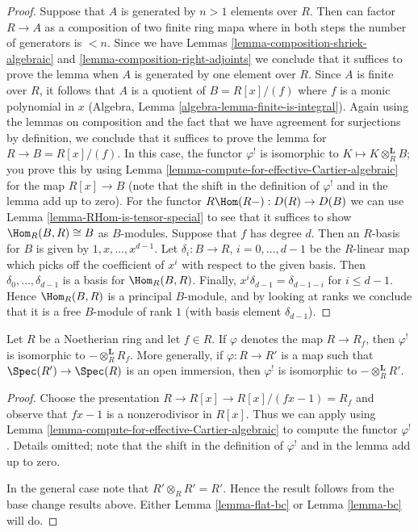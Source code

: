 \begin{proof}
Suppose that $A$ is generated by $n > 1$ elements over $R$.
Then can factor $R \to A$ as a composition of two finite ring mapa
where in both steps the number of generators is $< n$.
Since we have Lemmas \ref{lemma-composition-shriek-algebraic} and
\ref{lemma-composition-right-adjoints} we conclude that it suffices
to prove the lemma when $A$ is generated by one element over $R$.
Since $A$ is finite over $R$, it follows that $A$ is a quotient
of $B = R[x]/(f)$ where $f$ is a monic polynomial in $x$
(Algebra, Lemma \ref{algebra-lemma-finite-is-integral}).
Again using the lemmas on composition and the fact that we
have agreement for surjections by definition, we conclude that
it suffices to prove the lemma for $R \to B = R[x]/(f)$.
In this case, the functor $\varphi^!$ is isomorphic to
$K \mapsto K \otimes_R^\mathbf{L} B$; you prove this by
using Lemma \ref{lemma-compute-for-effective-Cartier-algebraic}
for the map $R[x] \to B$ (note that the shift in the definition
of $\varphi^!$ and in the lemma add up to zero).
For the functor $R\Hom(R -) : D(R) \to D(B)$ we can use
Lemma \ref{lemma-RHom-is-tensor-special}
to see that it suffices to show $\Hom_R(B, R) \cong B$
as $B$-modules. Suppose that $f$ has degree $d$.
Then an $R$-basis for $B$ is given by $1, x, \ldots, x^{d - 1}$.
Let $\delta_i : B \to R$, $i = 0, \ldots, d - 1$
be the $R$-linear map which picks off the coefficient
of $x^i$ with respect to the given basis. Then
$\delta_0, \ldots, \delta_{d - 1}$ is a basis for $\Hom_R(B, R)$.
Finally, $x^i \delta_{d - 1} = \delta_{d - 1 - i}$ for $i \leq d - 1$.
Hence $\Hom_R(B, R)$ is a principal $B$-module, and by looking
at ranks we conclude that it is a free $B$-module of rank $1$
(with basis element $\delta_{d - 1}$).
\end{proof}

\begin{lemma}
\label{lemma-upper-shriek-localize}
Let $R$ be a Noetherian ring and let $f \in R$.
If $\varphi$ denotes the map $R \to R_f$, then $\varphi^!$
is isomorphic to $- \otimes_R^\mathbf{L} R_f$.
More generally, if $\varphi : R \to R'$ is a map such that
$\Spec(R') \to \Spec(R)$ is an open immersion, then
$\varphi^!$ is isomorphic to $- \otimes_R^\mathbf{L} R'$.
\end{lemma}

\begin{proof}
Choose the presentation $R \to R[x] \to R[x]/(fx - 1) = R_f$ and observe
that $fx - 1$ is a nonzerodivisor in $R[x]$. Thus we can apply
using Lemma \ref{lemma-compute-for-effective-Cartier-algebraic}
to compute the functor $\varphi^!$. Details omitted;
note that the shift in the definition
of $\varphi^!$ and in the lemma add up to zero.

\medskip\noindent
In the general case note that $R' \otimes_R R' = R'$.
Hence the result follows from the base change results
above. Either Lemma \ref{lemma-flat-bc} or Lemma \ref{lemma-bc} will do.
\end{proof}

